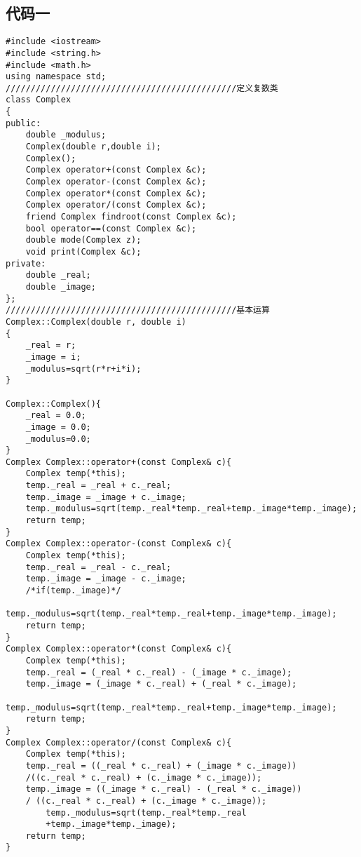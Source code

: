\documentclass[a4paper,11pt,onecolumn,twoside]{article}
\begin{document}
\begin{appendices}
      \section{代码一}
      \begin{lstlisting}
#include <iostream>
#include <string.h>
#include <math.h>
using namespace std;
//////////////////////////////////////////////定义复数类
class Complex
{
public:
    double _modulus;
    Complex(double r,double i);
    Complex();
    Complex operator+(const Complex &c);
    Complex operator-(const Complex &c);
    Complex operator*(const Complex &c);
    Complex operator/(const Complex &c);
    friend Complex findroot(const Complex &c);
    bool operator==(const Complex &c);
    double mode(Complex z);
    void print(Complex &c);
private:
    double _real;
    double _image;
};
//////////////////////////////////////////////基本运算
Complex::Complex(double r, double i)
{
    _real = r;
    _image = i;
    _modulus=sqrt(r*r+i*i);
}

Complex::Complex(){
    _real = 0.0;
    _image = 0.0;
    _modulus=0.0;
}
Complex Complex::operator+(const Complex& c){
    Complex temp(*this);
    temp._real = _real + c._real;
    temp._image = _image + c._image;
    temp._modulus=sqrt(temp._real*temp._real+temp._image*temp._image);
    return temp;
}
Complex Complex::operator-(const Complex& c){
    Complex temp(*this);
    temp._real = _real - c._real;
    temp._image = _image - c._image;
    /*if(temp._image)*/
        temp._modulus=sqrt(temp._real*temp._real+temp._image*temp._image);
    return temp;
}
Complex Complex::operator*(const Complex& c){
    Complex temp(*this);
    temp._real = (_real * c._real) - (_image * c._image);
    temp._image = (_image * c._real) + (_real * c._image);
        temp._modulus=sqrt(temp._real*temp._real+temp._image*temp._image);
    return temp;
}
Complex Complex::operator/(const Complex& c){
    Complex temp(*this);
    temp._real = ((_real * c._real) + (_image * c._image))
    /((c._real * c._real) + (c._image * c._image));
    temp._image = ((_image * c._real) - (_real * c._image)) 
    / ((c._real * c._real) + (c._image * c._image));
        temp._modulus=sqrt(temp._real*temp._real
        +temp._image*temp._image);
    return temp;
}


\end{lstlisting}
\end{appendices}
\end{document}
